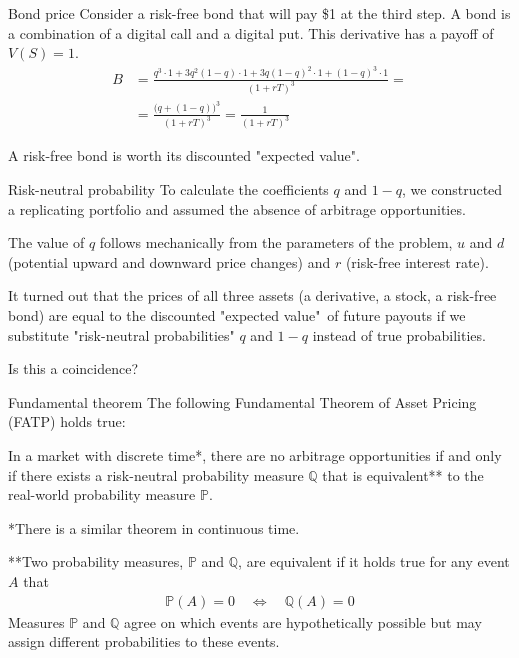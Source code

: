 \documentclass{beamer}
\begin{document}
\begin{frame}{Bond price}
\justify
Consider a risk-free bond that will pay \$1 at the third step. A bond is a combination of a digital call and a digital put. This derivative has a payoff of $V(S) = 1$.
\begin{align*}
B &= \frac{q^3 \cdot 1 + 3q^2(1-q) \cdot 1 + 3q(1-q)^2 \cdot 1 + (1-q)^3 \cdot 1}{(1+rT)^3} = \\
&= \frac{\Big(q + (1-q) \Big)^3}{(1+rT)^3} = \frac{1}{(1+rT)^3}
\end{align*}

\justify
A risk-free bond is worth its discounted "expected value".
\end{frame}



\begin{frame}{Risk-neutral probability}
\justify
To calculate the coefficients $q$ and $1-q$, we constructed a replicating portfolio and assumed the absence of arbitrage opportunities.

\justify
The value of $q$ follows mechanically from the parameters of the problem, $u$ and $d$ (potential upward and downward price changes) and $r$ (risk-free interest rate).

\justify
It turned out that the prices of all three assets (a derivative, a stock, a risk-free bond) are equal to the discounted "expected value"\ of future payouts if we substitute "risk-neutral probabilities" $q$ and $1-q$ instead of true probabilities.

\justify
Is this a coincidence?
\end{frame}



\begin{frame}{Fundamental theorem}
\justify
The following \alert{Fundamental Theorem of Asset Pricing (FATP)} holds true:

\justify
In a market with discrete time*, there are no arbitrage opportunities if and only if there exists a risk-neutral probability measure $\mathbb{Q}$ that is equivalent** to the real-world probability measure $\mathbb{P}$.

\justify
*There is a similar theorem in continuous time.

\justify
**Two probability measures, $\mathbb{P}$ and $\mathbb{Q}$, are equivalent if it holds true for any event $A$ that 
\begin{align*}
\mathbb{P}(A)=0 \quad \Leftrightarrow \quad \mathbb{Q}(A)=0
\end{align*}
Measures $\mathbb{P}$ and $\mathbb{Q}$ agree on which events are hypothetically possible but may assign different probabilities to these events.
\end{frame}
\end{document}
